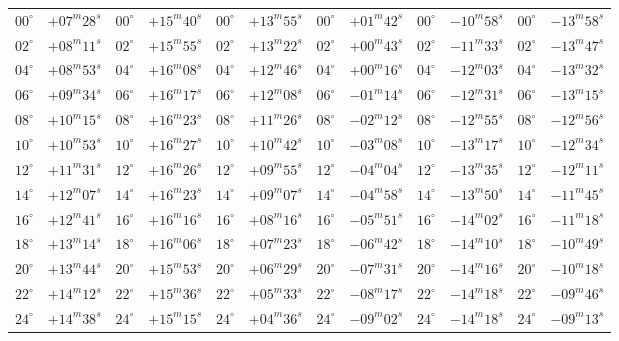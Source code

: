 \begin{table}[!h]
{\begin{tabular}{cr|cr|cr|cr|cr|cr}
$00^\circ$ & $+07^m28^s$ & $00^\circ$ & $+15^m40^s$ & $00^\circ$ & $+13^m55^s$ & $00^\circ$ & $+01^m42^s$ & $00^\circ$ & $-10^m58^s$ & $00^\circ$ &$ -13^m58^s$\\
$02^\circ$ & $+08^m11^s$ & $02^\circ$ & $+15^m55^s$ & $02^\circ$ & $+13^m22^s$ & $02^\circ$ & $+00^m43^s$ & $02^\circ$ & $-11^m33^s$ & $02^\circ$ & $-13^m47^s$\\
$04^\circ$ & $+08^m53^s$ & $04^\circ$ & $+16^m08^s$ & $04^\circ$ & $+12^m46^s$ & $04^\circ$ & $+00^m16^s$ & $04^\circ$ & $-12^m03^s$ & $04^\circ$ & $-13^m32^s$\\
$06^\circ$ & $+09^m34^s$ & $06^\circ$ & $+16^m17^s$ & $06^\circ$ & $+12^m08^s$ & $06^\circ$ & $-01^m14^s$ & $06^\circ$ & $-12^m31^s$ & $06^\circ$ & $-13^m15^s$\\
$08^\circ$ & $+10^m15^s$ & $08^\circ$ & $+16^m23^s$ & $08^\circ$ & $+11^m26^s$ & $08^\circ$ & $-02^m12^s$ & $08^\circ$ & $-12^m55^s$ & $08^\circ$ & $-12^m56^s$\\
$10^\circ$ & $+10^m53^s$ & $10^\circ$ & $+16^m27^s$ & $10^\circ$ & $+10^m42^s$ & $10^\circ$ & $-03^m08^s$ & $10^\circ$ & $-13^m17^s$ & $10^\circ$ & $-12^m34^s$\\
$12^\circ$ & $+11^m31^s$ & $12^\circ$ & $+16^m26^s$ & $12^\circ$ & $+09^m55^s$ & $12^\circ$ & $-04^m04^s$ & $12^\circ$ & $-13^m35^s$ & $12^\circ$ & $-12^m11^s$\\
$14^\circ$ & $+12^m07^s$ & $14^\circ$ & $+16^m23^s$ & $14^\circ$ & $+09^m07^s$ & $14^\circ$ & $-04^m58^s$ & $14^\circ$ & $-13^m50^s$ & $14^\circ$ & $-11^m45^s$\\
$16^\circ$ & $+12^m41^s$ & $16^\circ$ & $+16^m16^s$ & $16^\circ$ & $+08^m16^s$ & $16^\circ$ & $-05^m51^s$ & $16^\circ$ & $-14^m02^s$ & $16^\circ$ & $-11^m18^s$\\
$18^\circ$ & $+13^m14^s$ & $18^\circ$ & $+16^m06^s$ & $18^\circ$ & $+07^m23^s$ & $18^\circ$ & $-06^m42^s$ & $18^\circ$ & $-14^m10^s$ & $18^\circ$ & $-10^m49^s$\\
$20^\circ$ & $+13^m44^s$ & $20^\circ$ & $+15^m53^s$ & $20^\circ$ & $+06^m29^s$ & $20^\circ$ & $-07^m31^s$ & $20^\circ$ & $-14^m16^s$ & $20^\circ$ & $-10^m18^s$\\
$22^\circ$ & $+14^m12^s$ & $22^\circ$ & $+15^m36^s$ & $22^\circ$ & $+05^m33^s$ & $22^\circ$ & $-08^m17^s$ & $22^\circ$ & $-14^m18^s$ & $22^\circ$ & $-09^m46^s$\\
$24^\circ$ & $+14^m38^s$ & $24^\circ$ & $+15^m15^s$ & $24^\circ$ & $+04^m36^s$ & $24^\circ$ & $-09^m02^s$ & $24^\circ$ & $-14^m18^s$ & $24^\circ$ & $-09^m13^s$\\

\end{tabular}}
\end{table}
